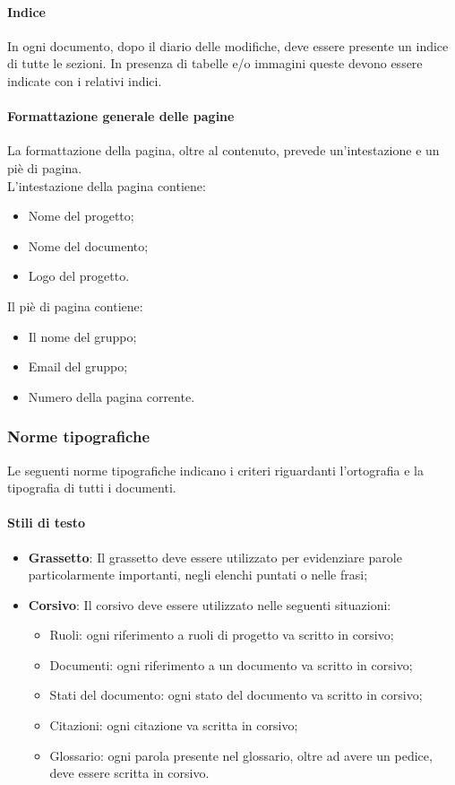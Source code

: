 \paragraph{Indice}
In ogni documento, dopo il diario delle modifiche, deve essere presente un 
indice di tutte le sezioni. In presenza di tabelle e/o immagini queste devono 
essere indicate con i relativi indici.

\paragraph{Formattazione generale delle pagine}
La formattazione della pagina, oltre al contenuto, prevede un'intestazione e un 
piè di pagina. \\
L'intestazione della pagina contiene:
\begin{itemize}
  \item Nome del progetto;
  \item Nome del documento;
  \item Logo del progetto.
\end{itemize}
Il piè di pagina contiene:
\begin{itemize}
  \item Il nome del gruppo;
  \item Email del gruppo;
  \item Numero della pagina corrente.
\end{itemize}

\subsubsection{Norme tipografiche}
Le seguenti norme tipografiche indicano i criteri riguardanti 
l'ortografia e la tipografia di tutti i documenti. 
\paragraph{Stili di testo}
\begin{itemize}
  \item \textbf{Grassetto}: Il grassetto deve essere utilizzato per evidenziare parole 
  particolarmente importanti, negli elenchi puntati o nelle frasi;
  \item \textbf{Corsivo}: Il corsivo deve essere utilizzato nelle seguenti 
  situazioni:
  \begin{itemize}
    \item Ruoli: ogni riferimento a ruoli di progetto va scritto in corsivo;
    \item Documenti: ogni riferimento a un documento va scritto in corsivo;
    \item Stati del documento: ogni stato del documento va scritto in corsivo;
    \item Citazioni: ogni citazione va scritta in corsivo;
    \item Glossario: ogni parola presente nel glossario, oltre ad avere un pedice, deve 
    essere scritta in corsivo.
  \end{itemize}
\end{itemize}

